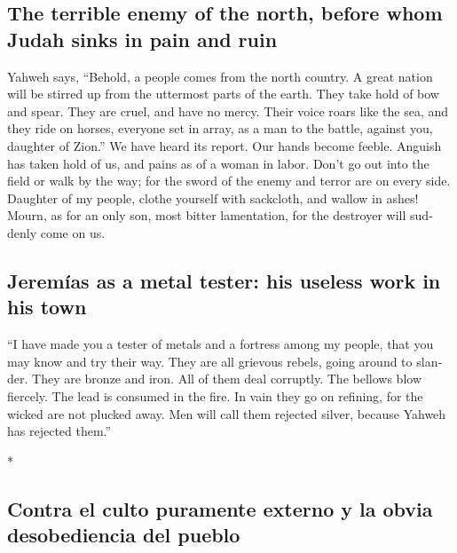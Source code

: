\begin{paracol}{2}
\begin{otherlanguage}{english}
\hypertarget{the-terrible-enemy-of-the-north-before-whom-judah-sinks-in-pain-and-ruin}{%
\subsection{The terrible enemy of the north, before whom Judah sinks in
pain and
ruin}\label{the-terrible-enemy-of-the-north-before-whom-judah-sinks-in-pain-and-ruin}}

 Yahweh says, ``Behold, a people comes from the north
country. A great nation will be stirred up from the uttermost parts of
the earth.  They take hold of bow and spear. They are
cruel, and have no mercy. Their voice roars like the sea, and they ride
on horses, everyone set in array, as a man to the battle, against you,
daughter of Zion.''  We have heard its report. Our hands
become feeble. Anguish has taken hold of us, and pains as of a woman in
labor.  Don't go out into the field or walk by the way;
for the sword of the enemy and terror are on every side. 
Daughter of my people, clothe yourself with sackcloth, and wallow in
ashes! Mourn, as for an only son, most bitter lamentation, for the
destroyer will suddenly come on us.

\hypertarget{jeremuxedas-as-a-metal-tester-his-useless-work-in-his-town}{%
\subsection{Jeremías as a metal tester: his useless work in his
town}\label{jeremuxedas-as-a-metal-tester-his-useless-work-in-his-town}}

 ``I have made you a tester of metals and a fortress
among my people, that you may know and try their way. 
They are all grievous rebels, going around to slander. They are bronze
and iron. All of them deal corruptly.  The bellows blow
fiercely. The lead is consumed in the fire. In vain they go on refining,
for the wicked are not plucked away.  Men will call them
rejected silver, because Yahweh has rejected them.''

\end{otherlanguage}

\switchcolumn[0]*

\hypertarget{contra-el-culto-puramente-externo-y-la-obvia-desobediencia-del-pueblo}{%
\subsection{Contra el culto puramente externo y la obvia desobediencia
del
pueblo}\label{contra-el-culto-puramente-externo-y-la-obvia-desobediencia-del-pueblo}}


\end{paracol}
